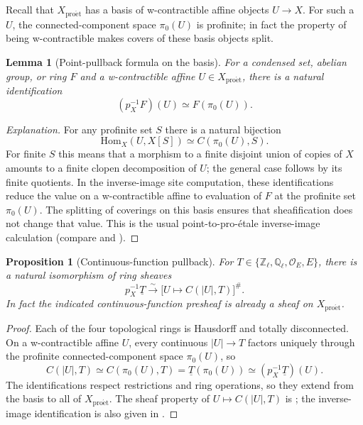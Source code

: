\documentclass[11pt,a4paper]{article}
\numberwithin{equation}{section}
\newtheorem{proposition}[theorem]{Proposition}
\newtheorem{lemma}[theorem]{Lemma}
\theoremstyle{definition}
\theoremstyle{remark}
\newcommand{\Hom}{\mathrm{Hom}}
\newcommand{\proet}{\mathrm{pro\acute{e}t}}
\newcommand{\OO}{\mathcal O}
\newcommand{\ringunder}[1]{\underline{#1}}
\begin{document}
Recall that $X_{\proet}$ has a basis of w-contractible affine objects
$U\to X$.  For such a $U$, the connected-component space $\pi_0(U)$
is profinite; in fact the property of being w-contractible makes
covers of these basis objects split.

\begin{lemma}[Point-pullback formula on the basis]\label{lem:point-eval}
For a condensed set, abelian group, or ring $F$ and a w-contractible
affine $U\in X_{\proet}$, there is a natural identification
\begin{equation}\label{eq:point-eval}
             (p_X^{-1}F)(U)\simeq F(\pi_0(U)).
\end{equation}
\end{lemma}
\begin{proof}[Explanation]
For any profinite set $S$ there is a natural bijection
\[
      \Hom_X(U,X[S])\simeq C(\pi_0(U),S).
\]
For finite $S$ this means that a morphism to a finite disjoint union
of copies of $X$ amounts to a finite clopen decomposition of $U$;
the general case follows by its finite quotients.  In the
inverse-image site computation, these identifications reduce the
value on a w-contractible affine to evaluation of $F$ at the
profinite set $\pi_0(U)$.  The splitting of coverings on this basis
ensures that sheafification does not change that value.  This is the
usual point-to-pro-\'{e}tale inverse-image calculation (compare
\cite[Example~3.1]{HRS} and \cite[Section~4.2]{BS}).
\end{proof}

\begin{proposition}[Continuous-function pullback]\label{prop:continuous-X}
For $T\in\{\mathbb Z_\ell,\mathbb Q_\ell,\OO_E,E\}$, there is a
natural isomorphism of ring sheaves
\begin{equation}\label{eq:continuous-X}
 \boxed{\quad
    p_X^{-1}\ringunder T
        \xrightarrow{\sim}
          \bigl[U\longmapsto C(|U|,T)\bigr]^\#.
 \quad}
\end{equation}
In fact the indicated continuous-function presheaf is already a
sheaf on $X_{\proet}$.
\end{proposition}
\begin{proof}
Each of the four topological rings is Hausdorff and totally
disconnected.  On a w-contractible affine $U$, every continuous
$|U|\to T$ factors uniquely through the profinite connected-component
space $\pi_0(U)$, so
\[
 C(|U|,T)\simeq C(\pi_0(U),T)
   =\ringunder T(\pi_0(U))
   \simeq(p_X^{-1}\ringunder T)(U).
\]
The identifications respect restrictions and ring operations, so they
extend from the basis to all of $X_{\proet}$.  The sheaf property of
$U\mapsto C(|U|,T)$ is \cite[Lemma~4.2.12]{BS}; the inverse-image
identification is also given in \cite[Example~3.1]{HRS}.
\end{proof}
\end{document}
